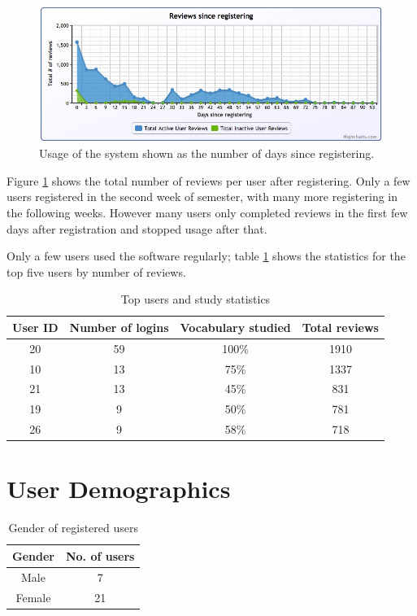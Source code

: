 \begin{figure}[h!]
\includegraphics[width=12cm]{img/usage_sinceregistering.jpg}
\caption{Usage of the system shown as the number of days since registering.}
\label{fig_usage_sinceregistering}
\end{figure}

Figure \ref{fig_usage_sinceregistering} shows the total number of reviews per user
after registering. Only a few users registered in the second week of semester,
 with many more registering in the following weeks. However many users only
 completed reviews in the first few days after registration and stopped usage after
 that.
 
Only a few users used the software regularly; table \ref{tbl_topusers} shows the
statistics for the top five users by number of reviews.

\begin{table}[h!]
\caption{Top users and study statistics}
\label{tbl_topusers}
\begin{tabular}{|c|c|c|c|}
\hline
User ID & Number of logins & Vocabulary studied & Total reviews \\
\hline
20 & 59 & 100\% & 1910 \\
10 & 13 & 75\% & 1337 \\
21 & 13 & 45\% & 831 \\
19 & 9 & 50\% & 781 \\
26 & 9 & 58\% & 718 \\
\hline
\end{tabular}
\end{table}

\section{User Demographics}

\begin{table}[h!]
\caption{Gender of registered users}
\begin{tabular}{|c|c|}
\hline
Gender & No. of users \\
\hline
Male & 7 \\
Female & 21 \\
\hline
\end{tabular}
\end{table}


